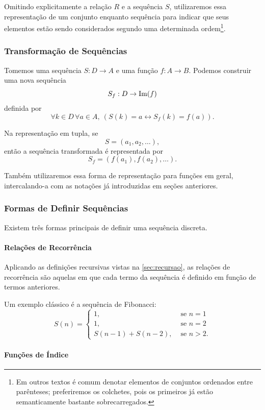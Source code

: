 Omitindo explicitamente a relação $R$ e a sequência $S$, utilizaremos essa
representação de um conjunto enquanto sequência para indicar que seus
elementos estão sendo considerados segundo uma determinada ordem\footnote{
  Em outros textos é comum denotar elementos de conjuntos ordenados
  entre parênteses; preferiremos os colchetes, pois os primeiros já
  estão semanticamente bastante sobrecarregados.
}.

\subsubsection{Transformação de Sequências}

Tomemos uma sequência $S : D \to A$ e uma função $f : A \to B$.
Podemos construir uma nova sequência
\[
  S_f : D \to \mathrm{Im}(f)
\]
definida por
\[
  \forall k \in D\,\forall a \in A,\ (
    S(k) = a \leftrightarrow S_f(k) = f(a)
  ).
\]

Na representação em tupla, se
\[
  S = (a_1,a_2,\ldots),
\]
então a sequência transformada é representada por
\[
  S_f = (f(a_1),f(a_2),\ldots).
\]

Também utilizaremos essa forma de representação para funções em geral,
intercalando-a com as notações já introduzidas em seções anteriores.

\subsubsection{Formas de Definir Sequências}

Existem três formas principais de definir uma sequência discreta.

\paragraph{Relações de Recorrência}

Aplicando as definições recursivas vistas na \ref{sec:recursao},
as relações de recorrência são aquelas em que cada termo da sequência
é definido em função de termos anteriores.

Um exemplo clássico é a sequência de Fibonacci:
\[
  S(n) =
  \begin{cases}
    1, &\text{ se } n = 1 \\
    1, &\text{ se } n = 2 \\
    S(n-1) + S(n-2), &\text{ se } n > 2.
  \end{cases}
\]

\paragraph{Funções de Índice}

